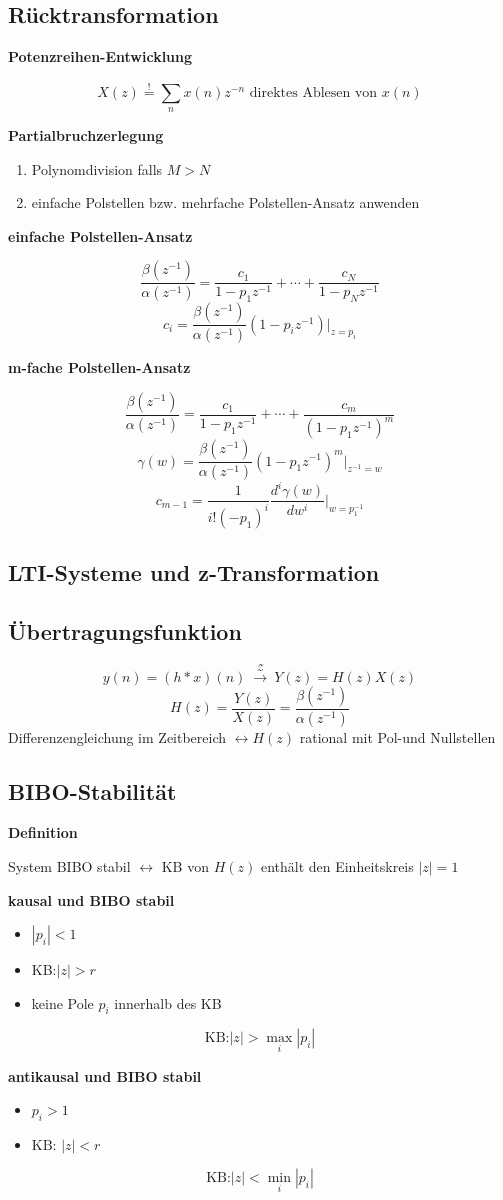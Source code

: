\documentclass[10pt,a4paper]{article}
\newcommand{\fancyformula}[2]{
	\small\raggedright{\sffamily\textbf{#1}}
	#2
}
\newcommand{\ztransform}{
	~\xrightarrow{~\mathcal{Z}~}~
}
\begin{document}
\subsection*{Rücktransformation}
\begin{multicols}{2}
	\fancyformula{Potenzreihen-Entwicklung}{
		\[X(z)\overset{!}{=} \sum_{n}^{}x(n)z^{-n}\text{ direktes Ablesen von $x(n)$}\]
	}
	\fancyformula{Partialbruchzerlegung}{
		\begin{enumerate}
			\item Polynomdivision falls $M>N$
			\item einfache Polstellen bzw. mehrfache Polstellen-Ansatz anwenden
		\end{enumerate}
	}
	\fancyformula{einfache Polstellen-Ansatz}{
	\[\frac{\beta(z^{-1})}{\alpha(z^{-1})}=\frac{c_{1}}{1-p_{1}z^{-1}}+\cdots+\frac{c_{N}}{1-p_{N}z^{-1}}\]
	\[c_{i}=\frac{\beta(z^{-1})}{\alpha(z^{-1})}(1-p_{i}z^{-1})|_{z=p_{i}}\]
	}
	\fancyformula{m-fache Polstellen-Ansatz}{
	\[\frac{\beta(z^{-1})}{\alpha(z^{-1})}=\frac{c_{1}}{1-p_{1}z^{-1}}+\cdots+\frac{c_{m}}{(1-p_{1}z^{-1})^m}\]
	\[\gamma(w)=\frac{\beta(z^{-1})}{\alpha(z^{-1})}(1-p_{1}z^{-1})^m|_{z^{-1}=w}\]
	\[c_{m-1}=\frac{1}{i!(-p_{1})^{i}}\frac{d^{i}\gamma(w)}{dw^{i}}|_{w=p_{1}^{-1}}\]
	}
\end{multicols}
\subsection*{LTI-Systeme und z-Transformation}
\subsection*{Übertragungsfunktion}
\begin{multicols}{2}
	
	\[y(n)=(h*x)(n)\ztransform Y(z)=H(z)X(z)\]
	\[H(z)=\frac{Y(z)}{X(z)}=\frac{\beta(z^{-1})}{\alpha(z^{-1})}\]
	Differenzengleichung im Zeitbereich $\leftrightarrow H(z)$ rational mit Pol-und Nullstellen\\
\end{multicols}
\subsection*{BIBO-Stabilität}
	\begin{multicols}{2}
		\fancyformula{Definition}{
		System BIBO stabil $\leftrightarrow$ KB von $H(z)$ enthält den Einheitskreis $|z|=1$\\
		}
		\fancyformula{kausal und BIBO stabil}{
		\begin{itemize}
		\item $|p_{i}|<1$
		\item KB:$|z|>r$
		\item keine Pole $p_{i}$ innerhalb des KB
		\end{itemize}
		\[\text{KB:}|z|>\max_{i}|p_{i}|\]
		}
		\fancyformula{antikausal und BIBO stabil}{
			\begin{itemize}
				\item $p_{i}>1$
				\item $\text{KB: } |z|<r$
			\end{itemize}
		\[\text{KB:}|z|<\min_{i}|p_{i}|\]
		}
	\end{multicols}
\end{document}

